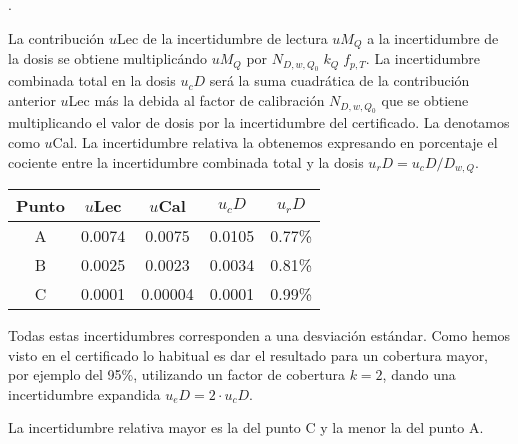 \documentclass[a4paper,12pt]{article} %
\newcounter{question}[section]
\newenvironment{question}{\refstepcounter{question} {\bfseries\thequestion}.\ }{}
\begin{document}
\begin{question}
{        La contribución $u$Lec de la incertidumbre de lectura $uM_Q$ a la incertidumbre de la dosis se obtiene multiplicándo $uM_Q$ por $N_{D, w, Q_0}\;k_Q\;f_{p,T}$. La incertidumbre combinada total en la dosis $u_cD$ será la suma cuadrática de la contribución anterior $u$Lec más la debida al factor de calibración $N_{D, w, Q_0}$ que se obtiene multiplicando el valor de dosis por la incertidumbre del certificado. La denotamos como $u$Cal. La incertidumbre relativa la obtenemos expresando en porcentaje el cociente entre la incertidumbre combinada total y la dosis $u_rD = u_cD/D_{w,Q}$.
        
        \begin{center}
        \vspace{10pt}
        \begin{tabular}{ c c c c c} 
        Punto & $u$Lec & $u$Cal & $u_cD$ & $u_rD$ \\
         \hline
         A	& 0.0074 &	0.0075	& 0.0105 & 0.77\% \\
         B	& 0.0025 &	0.0023	& 0.0034 & 0.81\% \\
         C	& 0.0001 &	0.00004	& 0.0001 & 0.99\%  \\
         \hline
        \end{tabular}
        \vspace{10pt}
        \end{center}
        
        Todas estas incertidumbres corresponden a una desviación estándar. Como hemos visto en el certificado lo habitual es dar el resultado para un cobertura mayor, por ejemplo del 95\%, utilizando un factor de cobertura $k=2$, dando una incertidumbre expandida $u_eD = 2\cdot u_cD$.
        
        La incertidumbre relativa mayor es la del punto C y la menor la del punto A.

    } %

\end{question}

\newpage


\end{document}
